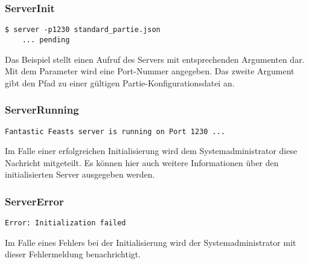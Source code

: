 \subsubsection{ServerInit}
    \lstset{language=bash} 
    \begin{lstlisting}[frame=single]
    $ server -p1230 standard_partie.json
    ... pending
    \end{lstlisting}
    Das Beispiel stellt einen Aufruf des Servers mit entsprechenden Argumenten dar. Mit dem Parameter wird eine Port-Nummer angegeben. Das zweite Argument gibt den Pfad zu einer gültigen Partie-Konfigurationsdatei an.

    \subsubsection{ServerRunning}
    \lstset{language=bash} 
    \begin{lstlisting}[frame=single]
    Fantastic Feasts server is running on Port 1230 ...
    \end{lstlisting}
    Im Falle einer erfolgreichen Initialisierung wird dem Systemadministrator diese Nachricht mitgeteilt. Es können hier auch weitere Informationen über den initialisierten Server ausgegeben werden.

    \subsubsection{ServerError}
    \lstset{language=bash} 
    \begin{lstlisting}[frame=single]
    Error: Initialization failed
    \end{lstlisting}
    Im Falle eines Fehlers bei der Initialisierung wird der Systemadministrator mit dieser Fehlermeldung benachrichtigt.


